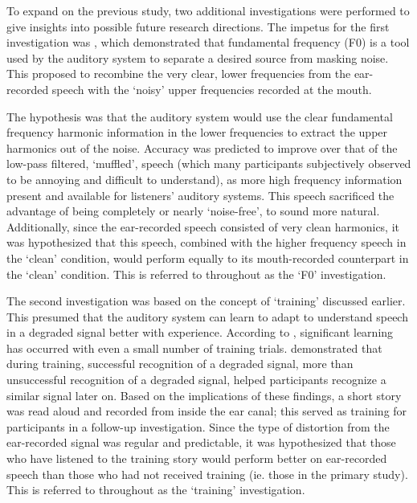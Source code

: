 To expand on the previous study, two additional investigations were performed to give insights into possible future research directions.  The impetus for the first investigation was \cite{bird:97}, which demonstrated that fundamental frequency (F0) is a tool used by the auditory system to separate a desired source from masking noise.  This \DIFdelbegin {}\DIFdelend \DIFaddbegin {}\DIFaddend proposed to recombine the very clear, lower frequencies from the ear-recorded speech with the `noisy' upper frequencies recorded at the mouth.  

The hypothesis was that the auditory system would use the clear fundamental frequency harmonic information in the lower frequencies to extract the upper harmonics out of the noise.  Accuracy was predicted to improve over that of the low-pass filtered, `muffled', \DIFdelbegin {}\DIFdelend \DIFaddbegin {}\DIFaddend speech (which many participants subjectively observed to be annoying and difficult to understand), as more high frequency information \DIFdelbegin {}\DIFdelend \DIFaddbegin {}\DIFaddend present and available for listeners' auditory systems.  This speech sacrificed the advantage of being completely or nearly `noise-free', to sound more natural.  Additionally, since the ear-recorded speech consisted of very clean harmonics, it was hypothesized that this speech, combined with the higher frequency \DIFdelbegin {}\DIFdelend \DIFaddbegin {}\DIFaddend speech in the `clean' condition, would perform equally to its mouth-recorded counterpart in the `clean' condition. This is referred to throughout as the `F0' investigation.

The second investigation was based on the concept of `training' discussed earlier.  This presumed that the auditory system can learn to adapt to understand speech in a degraded signal better with experience.  According to \cite{mattys:12}, significant learning has occurred with even a small number of training trials.  \cite{davis:05} demonstrated that during training, successful recognition of a degraded signal, more than unsuccessful recognition of a degraded signal, helped participants recognize a similar signal later on.  
Based on the implications of these findings, a short story was read aloud and recorded from inside the ear canal; this served as training for participants in a follow-up investigation.  Since the type of distortion from the ear-recorded signal was regular and predictable, it was hypothesized that those who have listened to the training story would perform better on ear-recorded speech than those who had not received training (ie. those in the primary study). This is referred to throughout as the `training' investigation.

